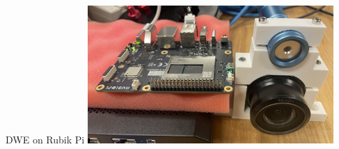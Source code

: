 




\begin{frame}{DWE on Rubik Pi}
    \centering
    \includegraphics[height=0.7\textheight,width=0.7\textwidth,keepaspectratio]{images/rubik_pi_dwe.png}
\end{frame}

